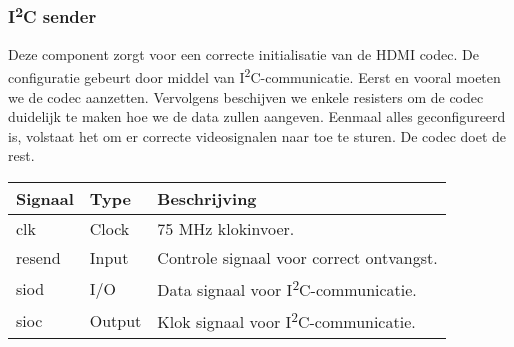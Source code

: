  		\subsubsection{I\textsuperscript{2}C sender}

 			\par Deze component zorgt voor een correcte initialisatie van de HDMI codec. De configuratie gebeurt door middel van I\textsuperscript{2}C-communicatie. Eerst en vooral moeten we de codec aanzetten. Vervolgens beschijven we enkele resisters om de codec duidelijk te maken hoe we de data zullen aangeven. Eenmaal alles geconfigureerd is, volstaat het om er correcte videosignalen naar toe te sturen. De codec doet de rest.

			\begin{table}[H] 
				\begin{tabular}{p{} p{} p{}} \toprule \textbf{Signaal} & \textbf{Type} & \textbf{Beschrijving} \\ \midrule
					clk & Clock & 75 MHz klokinvoer. \\
					resend & Input & Controle signaal voor correct ontvangst. \\
					siod & I/O & Data signaal voor I\textsuperscript{2}C-communicatie. \\
					sioc & Output & Klok signaal voor I\textsuperscript{2}C-communicatie. \\
					\bottomrule 
				\end{tabular} 
			\end{table}
			